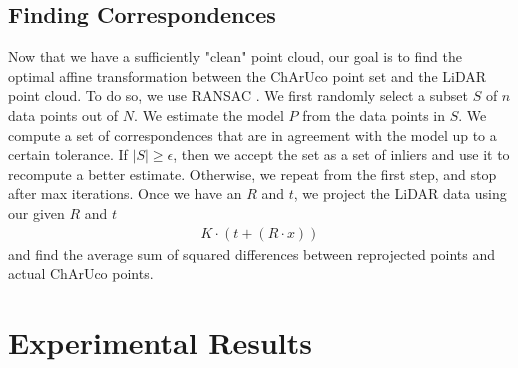 \documentclass[conference]{IEEEtran}
\begin{document}
\subsection{Finding Correspondences}
Now that we have a sufficiently "clean" point cloud, our goal is to find the optimal affine transformation between the ChArUco point set and the LiDAR point cloud. To do so, we use RANSAC \cite{Fischler}. We first randomly select a subset $S$ of $n$ data points out of $N$. We estimate the model $P$ from the data points in $S$. We compute a set of correspondences that are in agreement with the model up to a certain tolerance. If $|S| \geq \epsilon$, then we accept the set as a set of inliers and use it to recompute a better estimate. Otherwise, we repeat from the first step, and stop after max iterations. Once we have an $R$ and $t$, we project the LiDAR data using our given $R$ and $t$ 
\begin{align}
    K \cdot (t + (R \cdot x))
\end{align}
and find the average sum of squared differences between reprojected points and actual ChArUco points.
\section{Experimental Results}
\end{document}
